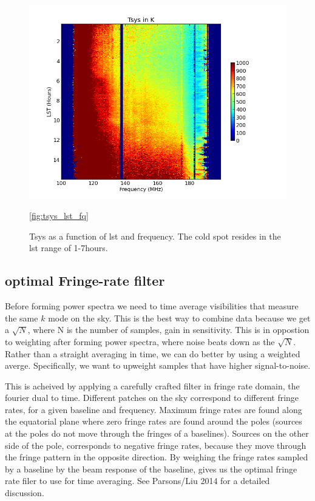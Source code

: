 \documentclass[twocolumn,numberedappendix]{emulateapj}
\begin{document}
\begin{figure}
\centering
\includegraphics[width=\columnwidth]{plots/tsys_lst_freq.png}
\caption{Tsys as a function of lst and frequency. The cold spot resides in the
lst range of 1-7hours.}
\ref{fig:tsys_lst_fq}
\end{figure}






\subsection{optimal Fringe-rate filter}
Before forming power spectra we need to time average visibilities that measure
the same $k$ mode on the sky. This is the best way to combine data because we
get a $\sqrt{N}$, where N is the number of samples, gain in sensitivity. This is
in oppostion to weighting after forming power spectra, where noise beats down as
the $\sqrt{N}$. Rather than a straight averaging in time, we can do better by
using a weighted averge. Specifically, we want to upweight samples that have
higher signal-to-noise. 

This is acheived by applying a carefully crafted filter in fringe rate domain,
the fourier dual to time. Different patches on the sky correspond to different
fringe rates, for a given baseline and frequency. Maximum fringe rates are found
along the equatorial plane where zero fringe rates are found around the poles
(sources at the poles do not move through the fringes of a baselines). Sources
on the other side of the pole, corresponds to negative fringe rates, because
they move through the fringe pattern in the opposite direction. By weighing the
fringe rates sampled by a baseline by the beam response of the baseline, gives
us the optimal fringe rate filer to use for time averaging. See Parsons/Liu 2014
for a detailed discussion.
\end{document}
